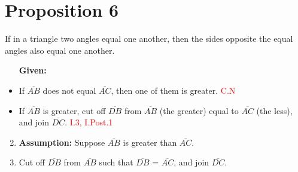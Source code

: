 
\section*{Proposition 6}
	
\begin{thm}
If in a triangle two angles equal one another, then the sides opposite the equal angles also equal one another.
\end{thm}

\begin{figure}[H]
	\caption{}
\end{figure}

\begin{itemize}
	\item[\textbf{Given:}]
    	\item  If $\overline{AB}$ does not equal $\overline{AC}$, then one of them is greater. \hfill\textcolor{red}{C.N}
    	\item If $\overline{AB}$ is greater, cut off $\overline{DB}$ from $\overline{AB}$ (the greater) equal to $\overline{AC}$ (the less), and join $\overline{DC}$.\hfill\textcolor{red}{ I.3, I.Post.1}
\end{itemize}

\begin{con}

\begin{enumerate}
\item[]
    	\item \textbf{Assumption:} Suppose $\overline{AB}$ is greater than $\overline{AC}$.
    
	\item Cut off $\overline{DB}$ from $\overline{AB}$ such that $\overline{DB}$ = $\overline{AC}$, and join $\overline{DC}$.

\begin{figure}[H]
	\caption{}
\end{figure}

\end{enumerate}

\end{con}


